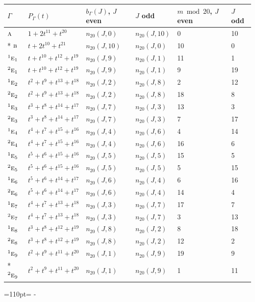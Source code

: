 \documentclass[10pt,a4paper]{article}
\newcommand{\needspace}[1]{\par\penalty-100\begingroup\dimen0=#1\relax\dimen2=\pagegoal
  \advance\dimen2-\pagetotal\ifdim\dimen0>\dimen2\relax\ifdim\dimen2>0pt\vfil\break\fi\fi
  \endgroup}
\numberwithin{equation}{section}
\newcommand{\irr}[1]{\text{\normalfont\scshape #1}}
\newcommand{\conjpair}[1]{{}^{#1}}
\begin{document}
{\small\begin{longtable}{@{}llllll@{}}\toprule
$\Gamma$ & $P_\Gamma(t)$ & $b_\Gamma(J)$, $J$ even & $J$ odd & $m \bmod 20$, $J$ even & $J$ odd\\\midrule\endhead
\bottomrule\endfoot\endlastfoot
$\irr{a}$ & $1 + 2t^{11} + t^{20}$ & $n_{20}(J,0)$ & $n_{20}(J,10)$ & 0 & 10\\*
$\irr{b}$ & $t + 2t^{10} + t^{21}$ & $n_{20}(J,10)$ & $n_{20}(J,0)$ & 10 & 0\\
$\conjpair{1}\irr{e}_{1}$ & $t + t^{10} + t^{12} + t^{19}$ & $n_{20}(J,9)$ & $n_{20}(J,1)$ & 11 & 1\\
$\conjpair{2}\irr{e}_{1}$ & $t + t^{10} + t^{12} + t^{19}$ & $n_{20}(J,9)$ & $n_{20}(J,1)$ & 9 & 19\\
$\conjpair{1}\irr{e}_{2}$ & $t^{2} + t^{9} + t^{13} + t^{18}$ & $n_{20}(J,2)$ & $n_{20}(J,8)$ & 2 & 12\\
$\conjpair{2}\irr{e}_{2}$ & $t^{2} + t^{9} + t^{13} + t^{18}$ & $n_{20}(J,2)$ & $n_{20}(J,8)$ & 18 & 8\\
$\conjpair{1}\irr{e}_{3}$ & $t^{3} + t^{8} + t^{14} + t^{17}$ & $n_{20}(J,7)$ & $n_{20}(J,3)$ & 13 & 3\\
$\conjpair{2}\irr{e}_{3}$ & $t^{3} + t^{8} + t^{14} + t^{17}$ & $n_{20}(J,7)$ & $n_{20}(J,3)$ & 7 & 17\\
$\conjpair{1}\irr{e}_{4}$ & $t^{4} + t^{7} + t^{15} + t^{16}$ & $n_{20}(J,4)$ & $n_{20}(J,6)$ & 4 & 14\\
$\conjpair{2}\irr{e}_{4}$ & $t^{4} + t^{7} + t^{15} + t^{16}$ & $n_{20}(J,4)$ & $n_{20}(J,6)$ & 16 & 6\\
$\conjpair{1}\irr{e}_{5}$ & $t^{5} + t^{6} + t^{15} + t^{16}$ & $n_{20}(J,5)$ & $n_{20}(J,5)$ & 15 & 5\\
$\conjpair{2}\irr{e}_{5}$ & $t^{5} + t^{6} + t^{15} + t^{16}$ & $n_{20}(J,5)$ & $n_{20}(J,5)$ & 5 & 15\\
$\conjpair{1}\irr{e}_{6}$ & $t^{5} + t^{6} + t^{14} + t^{17}$ & $n_{20}(J,6)$ & $n_{20}(J,4)$ & 6 & 16\\
$\conjpair{2}\irr{e}_{6}$ & $t^{5} + t^{6} + t^{14} + t^{17}$ & $n_{20}(J,6)$ & $n_{20}(J,4)$ & 14 & 4\\
$\conjpair{1}\irr{e}_{7}$ & $t^{4} + t^{7} + t^{13} + t^{18}$ & $n_{20}(J,3)$ & $n_{20}(J,7)$ & 17 & 7\\
$\conjpair{2}\irr{e}_{7}$ & $t^{4} + t^{7} + t^{13} + t^{18}$ & $n_{20}(J,3)$ & $n_{20}(J,7)$ & 3 & 13\\
$\conjpair{1}\irr{e}_{8}$ & $t^{3} + t^{8} + t^{12} + t^{19}$ & $n_{20}(J,8)$ & $n_{20}(J,2)$ & 8 & 18\\
$\conjpair{2}\irr{e}_{8}$ & $t^{3} + t^{8} + t^{12} + t^{19}$ & $n_{20}(J,8)$ & $n_{20}(J,2)$ & 12 & 2\\
$\conjpair{1}\irr{e}_{9}$ & $t^{2} + t^{9} + t^{11} + t^{20}$ & $n_{20}(J,1)$ & $n_{20}(J,9)$ & 19 & 9\\*
$\conjpair{2}\irr{e}_{9}$ & $t^{2} + t^{9} + t^{11} + t^{20}$ & $n_{20}(J,1)$ & $n_{20}(J,9)$ & 1 & 11\\
\bottomrule\end{longtable}}
\needspace{110pt}
\end{document}
